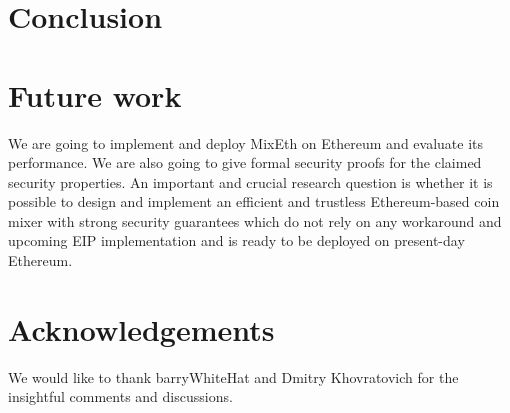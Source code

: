 \documentclass[a4paper]{article}
\theoremstyle{definition}
\begin{document}
\section{Conclusion} \label{conclusion}
 
\section{Future work}
We are going to implement and deploy MixEth on Ethereum and evaluate its performance. We are also going to give formal security proofs for the claimed security properties.  
An important and crucial research question is whether it is possible to design and implement an efficient and trustless Ethereum-based coin mixer with strong security guarantees which do not rely on any workaround and upcoming EIP implementation and is ready to be deployed on present-day Ethereum. 

\section{Acknowledgements}
We would like to thank barryWhiteHat and Dmitry Khovratovich for the insightful comments and discussions. 



\end{document}
